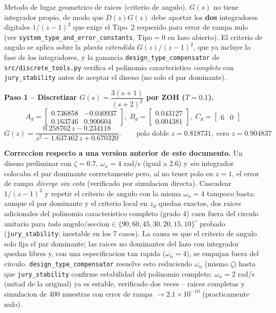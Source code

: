 \documentclass[11pt]{article}
\begin{document}
Metodo de lugar geometrico de raices (criterio de angulo). $G(s)$ no tiene
integrador propio, de modo que $D(z)G(z)$ debe aportar los \textbf{dos}
integradores digitales $1/(z-1)^2$ que exige el Tipo~2 requerido para error
de rampa nulo (ver \texttt{system\_type\_and\_error\_constants}, Tipo$=0$ en
lazo abierto). El criterio de angulo se aplica sobre la \emph{planta
extendida} $G(z)/(z-1)^2$, que ya incluye la fase de los integradores, y la
ganancia \texttt{design\_type\_compensator} de \texttt{src/discrete\_tools.py}
verifica el polinomio caracteristico \emph{completo} con \texttt{jury\_stability}
antes de aceptar el diseno (no solo el par dominante).

\textbf{Paso 1 -- Discretizar $G(s)=\dfrac{3(s+1)}{(s+2)^2}$ por ZOH ($T=0.1$).}
\begin{equation}
A_d=\begin{bmatrix}0.736858&-0.040937\\0.163746&0.900604\end{bmatrix},\;
B_d=\begin{bmatrix}0.043127\\0.004381\end{bmatrix},\;
C_d=\begin{bmatrix}6&0\end{bmatrix}
\end{equation}
\begin{equation}
G(z)=\frac{0.258762\,z-0.234118}{z^2-1.637462\,z+0.670320},\qquad
\text{polo doble } z=0.818731,\;\text{cero } z=0.904837
\end{equation}

\begin{findingbox}
\textbf{Correccion respecto a una version anterior de este documento.} Un
diseno preliminar con $\zeta=0.7,\,\omega_n=4$ rad/s (igual a 2.6) y \emph{sin}
integrador colocaba el par dominante correctamente pero, al no tener polo en
$z=1$, el error de rampa \emph{diverge sin cota} (verificado por simulacion
directa). Cascadear $1/(z-1)^2$ y repetir el criterio de angulo con la misma
$\omega_n=4$ tampoco basta: aunque el par dominante y el criterio local en
$z_d$ quedan exactos, dos raices adicionales del polinomio caracteristico
completo (grado 4) caen fuera del circulo unitario para \emph{todo}
$\text{angulo/seccion}\in\{90,60,45,30,20,15,10\}^\circ$ probado
(\texttt{jury\_stability}: inestable en los 7 casos). La causa es que el
criterio de angulo solo fija el par dominante; las raices no dominantes del
lazo con integrador quedan libres y, con una especificacion tan rapida
($\omega_n=4$), se empujan fuera del circulo. \texttt{design\_type\_compensator}
resuelve esto reduciendo $\omega_n$ (mismo $\zeta$) hasta que
\texttt{jury\_stability} confirme estabilidad del polinomio completo:
$\omega_n=2$ rad/s (mitad de la original) ya es estable, verificado dos veces
-- raices completas y simulacion de 400 muestras con error de rampa
$\to 2.1\times10^{-10}$ (practicamente nulo).
\end{findingbox}
\end{document}
